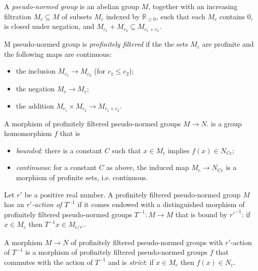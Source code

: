 \begin{definition}
  \label{pseudo_normed_group}
  \leanok
  A \emph{pseudo-normed group} is an abelian group $M$,
  together with an increasing filtration $M_c \subseteq M$ of subsets $M_c$ indexed by $\mathbb R_{\ge 0}$,
  such that each $M_c$ contains $0$, is closed under negation,
  and $M_{c_1} + M_{c_2} \subseteq M_{c_1 + c_2}$.

  M pseudo-normed group is \emph{profinitely filtered}
  if the the sets $M_c$ are profinite
  and the following maps are continuous:
  \begin{itemize}
    \item the inclusion $M_{c_1} \to M_{c_2}$ (for $c_1 \le c_2$);
    \item the negation $M_c \to M_c$;
    \item the addition $M_{c_1} \times M_{c_2} \to M_{c_1 + c_2}$.
  \end{itemize}

  A morphism of profinitely filtered pseudo-normed groups $M \to N$.
  is a group homomorphism $f$ that is
  \begin{itemize}
    \item \emph{bounded}:
      there is a constant $C$
      such that $x \in M_c$ implies $f(x) \in N_{Cc}$;
    \item \emph{continuous}:
      for a constant $C$ as above,
      the induced map $M_c \to N_{Cc}$ is
      a morphism of profinite sets, i.e. continuous.
  \end{itemize}
\end{definition}

\begin{definition}
  \label{profinitely_filtered_pseudo_normed_group_with_Tinv}
  \leanok
  Let $r'$ be a positive real number.
  A profinitely filtered pseudo-normed group $M$
  has an \emph{$r'$-action of $T^{-1}$}
  if it comes endowed with a distinguished morphism
  of profinitely filtered pseudo-normed groups
  $T^{-1} \colon M \to M$
  that is bound by $r'^{-1}$:
  if $x \in M_c$ then $T^{-1}x \in M_{c/r'}$.

  A morphism $M \to N$
  of profinitely filtered pseudo-normed groups with $r'$-action of $T^{-1}$
  is a morphism of profinitely filtered pseudo-normed groups $f$
  that commutes with the action of $T^{-1}$
  and is \emph{strict}: if $x \in M_c$ then $f(x) \in N_c$.
\end{definition}

